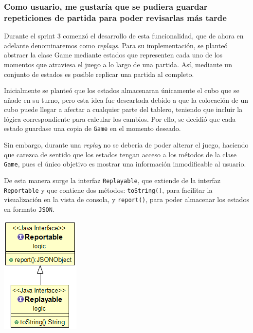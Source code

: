 \documentclass[../DocumentoOficial.tex]{subfiles}
\begin{document}
\subsubsection{Como usuario, me gustaría que se pudiera guardar repeticiones de partida para poder revisarlas más tarde}
\begin{sprint}[3]
Durante el sprint 3 comenzó el desarrollo de esta funcionalidad, que de ahora en adelante denominaremos como \textit{replays}. Para su implementación, se planteó abstraer la clase Game mediante estados que representen cada uno de los momentos que atraviesa el juego a lo largo de una partida. Así, mediante un conjunto de estados es posible replicar una partida al completo.

Inicialmente se planteó que los estados almacenaran únicamente el cubo que se añade en su turno, pero esta idea fue descartada debido a que la colocación de un cubo puede llegar a afectar a cualquier parte del tablero, teniendo que incluir la lógica correspondiente para calcular los cambios. Por ello, se decidió que cada estado guardase una copia de \texttt{Game} en el momento deseado.

Sin embargo, durante una \textit{replay} no se debería de poder alterar el juego, haciendo que carezca de sentido que los estados tengan acceso a  los métodos de la clase \texttt{Game}, pues el único objetivo es mostrar una información inmodificable al usuario.

De esta manera surge la interfaz \texttt{Replayable}, que extiende de la interfaz \texttt{Reportable} y que contiene dos métodos: \texttt{toString()}, para facilitar la visualización en la vista de consola, y \texttt{report()}, para poder almacenar los estados en formato \texttt{JSON}.

\begin{center}
\includegraphics[scale=0.5]{replayable-reportable-sprint-3.png}
\end{center}


\end{sprint}
\end{document}
